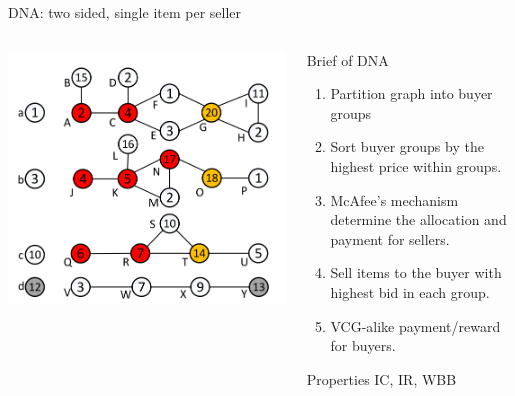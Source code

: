 \documentclass{beamer}
\begin{document}
\begin{frame}{DNA: two sided, single item per seller}
	\begin{columns}
		\begin{column}{0.3\textwidth}
			\begin{center}
				\includegraphics[width=\textwidth]{DNA-example}
			\end{center}
		\end{column}
		\begin{column}{0.7\textwidth}
			\begin{block}{Brief of DNA}
				\begin{enumerate}
					\item Partition graph into buyer groups
					\item Sort buyer groups by the highest price within groups.
					\item McAfee's mechanism determine the allocation and payment for sellers.
					\item Sell items to the buyer with highest bid in each group.
					\item VCG-alike payment/reward for buyers.
				\end{enumerate}
			\end{block}
			\begin{block}{Properties}
				IC, IR, WBB
			\end{block}
		\end{column}
	\end{columns}
\end{frame}
\end{document}
